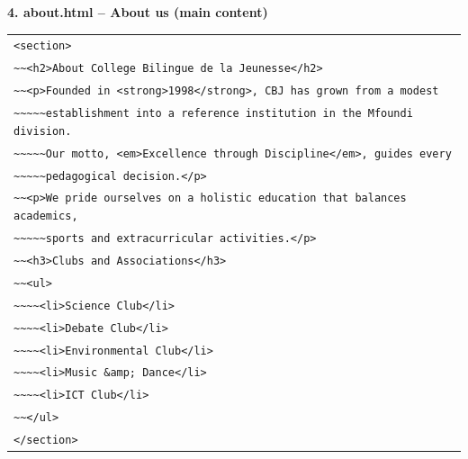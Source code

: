\documentclass[11pt]{article}
\begin{document}
\textbf{4. about.html -- About us (main content)}
\begin{center}
\begin{tabular}{l}
\texttt{<section>} \\
\texttt{\textasciitilde{}\textasciitilde{}<h2>About College Bilingue de la Jeunesse</h2>} \\
\texttt{\textasciitilde{}\textasciitilde{}<p>Founded in <strong>1998</strong>, CBJ has grown from a modest} \\
\texttt{\textasciitilde{}\textasciitilde{}\textasciitilde{}\textasciitilde{}\textasciitilde{}establishment into a reference institution in the Mfoundi division.} \\
\texttt{\textasciitilde{}\textasciitilde{}\textasciitilde{}\textasciitilde{}\textasciitilde{}Our motto, <em>Excellence through Discipline</em>, guides every} \\
\texttt{\textasciitilde{}\textasciitilde{}\textasciitilde{}\textasciitilde{}\textasciitilde{}pedagogical decision.</p>} \\
\texttt{\textasciitilde{}\textasciitilde{}<p>We pride ourselves on a holistic education that balances academics,} \\
\texttt{\textasciitilde{}\textasciitilde{}\textasciitilde{}\textasciitilde{}\textasciitilde{}sports and extracurricular activities.</p>} \\
\texttt{\textasciitilde{}\textasciitilde{}<h3>Clubs and Associations</h3>} \\
\texttt{\textasciitilde{}\textasciitilde{}<ul>} \\
\texttt{\textasciitilde{}\textasciitilde{}\textasciitilde{}\textasciitilde{}<li>Science Club</li>} \\
\texttt{\textasciitilde{}\textasciitilde{}\textasciitilde{}\textasciitilde{}<li>Debate Club</li>} \\
\texttt{\textasciitilde{}\textasciitilde{}\textasciitilde{}\textasciitilde{}<li>Environmental Club</li>} \\
\texttt{\textasciitilde{}\textasciitilde{}\textasciitilde{}\textasciitilde{}<li>Music \&amp; Dance</li>} \\
\texttt{\textasciitilde{}\textasciitilde{}\textasciitilde{}\textasciitilde{}<li>ICT Club</li>} \\
\texttt{\textasciitilde{}\textasciitilde{}</ul>} \\
\texttt{</section>}
\end{tabular}
\end{center}
\end{document}
